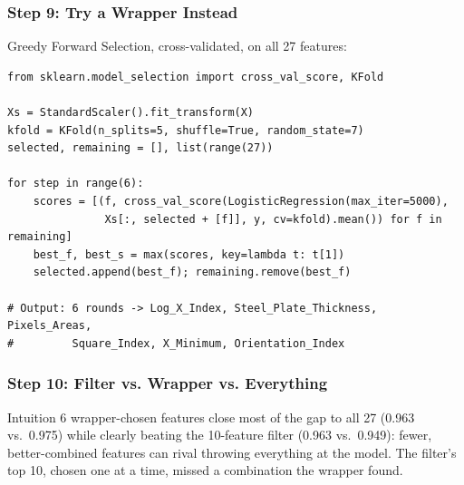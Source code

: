 \begin{frame}[fragile]\frametitle{Step 9: Try a Wrapper Instead}
Greedy Forward Selection, cross-validated, on all 27 features:
\begin{lstlisting}
from sklearn.model_selection import cross_val_score, KFold

Xs = StandardScaler().fit_transform(X)
kfold = KFold(n_splits=5, shuffle=True, random_state=7)
selected, remaining = [], list(range(27))

for step in range(6):
    scores = [(f, cross_val_score(LogisticRegression(max_iter=5000),
               Xs[:, selected + [f]], y, cv=kfold).mean()) for f in remaining]
    best_f, best_s = max(scores, key=lambda t: t[1])
    selected.append(best_f); remaining.remove(best_f)

# Output: 6 rounds -> Log_X_Index, Steel_Plate_Thickness, Pixels_Areas,
#         Square_Index, X_Minimum, Orientation_Index
\end{lstlisting}
\end{frame}

\begin{frame}[fragile]\frametitle{Step 10: Filter vs. Wrapper vs. Everything}
\begin{center}
\small
{}
\end{center}
\begin{block}{Intuition}
6 wrapper-chosen features close most of the gap to all 27 (0.963 vs.\ 0.975) while clearly beating the 10-feature filter (0.963 vs.\ 0.949): fewer, better-combined features can rival throwing everything at the model. The filter's top 10, chosen one at a time, missed a combination the wrapper found.
\end{block}
\end{frame}

